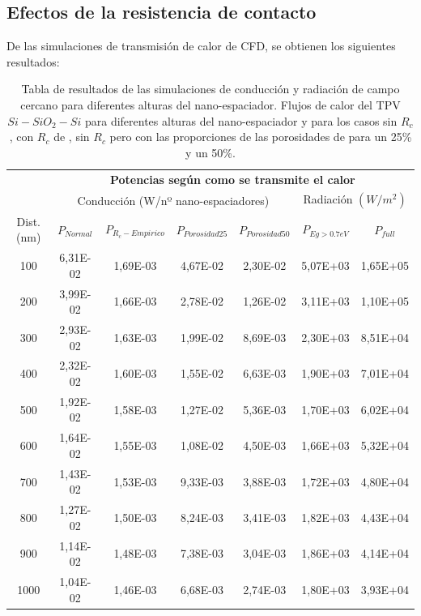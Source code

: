 \subsection{Efectos de la resistencia de contacto}

De las simulaciones de transmisión de calor de CFD, se obtienen los siguientes resultados:
\begin{table}[H]
	\centering
		\begin{tabular}{|c||c|c|c|c||c|c|}
		\hline
			\multirow{2}{*}{ }& \multicolumn{6}{c|}{\textbf{\large Potencias según como se transmite el calor}}\\ \cline{2-7}
		  & \multicolumn{4}{c||}{Conducción (W/nº nano-espaciadores)}& \multicolumn{2}{c|}{Radiación $(W/m^2)$}\\ \hline
			Dist. (nm)&$P_{Normal}$&$P_{R_c-Empirico}$&$P_{Porosidad25}$&$P_{Porosidad50}$&$P_{Eg>0.7eV}$&$P_{full}$\\ \hline \hline
			100&6,31E-02&1,69E-03&4,67E-02&2,30E-02&5,07E+03&1,65E+05\\ \hline
			200&3,99E-02&1,66E-03&2,78E-02&1,26E-02&3,11E+03&1,10E+05\\ \hline
			300&2,93E-02&1,63E-03&1,99E-02&8,69E-03&2,30E+03&8,51E+04\\ \hline
			400&2,32E-02&1,60E-03&1,55E-02&6,63E-03&1,90E+03&7,01E+04\\ \hline
			500&1,92E-02&1,58E-03&1,27E-02&5,36E-03&1,70E+03&6,02E+04\\ \hline
			600&1,64E-02&1,55E-03&1,08E-02&4,50E-03&1,66E+03&5,32E+04\\ \hline
			700&1,43E-02&1,53E-03&9,33E-03&3,88E-03&1,72E+03&4,80E+04\\ \hline
			800&1,27E-02&1,50E-03&8,24E-03&3,41E-03&1,82E+03&4,43E+04\\ \hline
			900&1,14E-02&1,48E-03&7,38E-03&3,04E-03&1,86E+03&4,14E+04\\ \hline
			1000&1,04E-02&1,46E-03&6,68E-03&2,74E-03&1,80E+03&3,93E+04\\ \hline
		\end{tabular}
	\caption{Tabla de resultados de las simulaciones de conducción y radiación de campo cercano para diferentes alturas del nano-espaciador. Flujos de calor del TPV $Si-SiO_2-Si$ para diferentes alturas del nano-espaciador y para los casos sin $R_c$, con $R_c$ de \cite{nf_TPV_Pillars_SiO2}, sin $R_c$ pero con las proporciones de las porosidades de \cite{ThermalConductivity_SiO2_2018} para un 25\% y un 50\%.}
	\label{tab:condTerSiSiO2Si}
\end{table}
